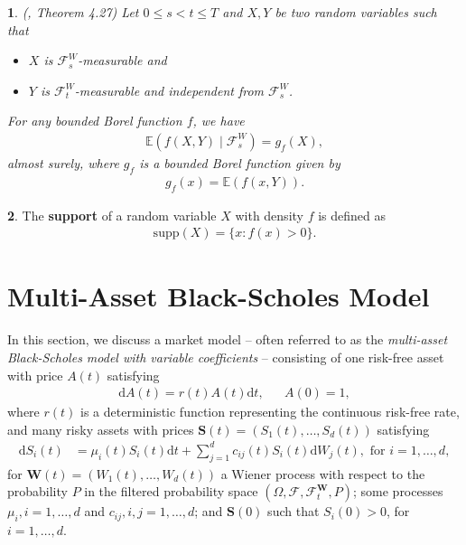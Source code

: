 \documentclass[english]{article}
\newcommand{\comment}[1]{\color{blue}#1\color{black}}
\numberwithin{equation}{section}
\numberwithin{figure}{section}
\theoremstyle{bolddescit}
\newtheorem{theorem}{\protect\theoremname}[section]
\theoremstyle{definition}
\newtheorem{definition}[theorem]{\protect\definitionname}
\theoremstyle{definition}
\theoremstyle{plain}
\theoremstyle{plain}
\theoremstyle{bolddesc}
\theoremstyle{plain}
\theoremstyle{remark}
\providecommand{\definitionname}{Definition}
\providecommand{\theoremname}{Theorem}
\begin{document}
\begin{theorem}\label{thm:cond-exp-measurable-independent}
  (\cite{kopp_probability_2013}, Theorem 4.27)
  Let $0 \le s < t \le T$ and $X, Y$ be two random variables such that
  \begin{itemize}
    \item $X$ is $\mathcal{F}^W_s$-measurable and
    \item $Y$ is $\mathcal{F}^W_t$-measurable and independent from $\mathcal{F}^W_s$.
  \end{itemize}
  For any bounded Borel function $f$, we have
  \begin{align*}
    \mathbb{E}(f(X,Y) \mid \mathcal{F}^W_s) = g_f(X),
  \end{align*}
  almost surely, where $g_f$ is a bounded Borel function given by
  \begin{align*}
    g_f(x) = \mathbb{E}(f(x,Y)).
  \end{align*}
\end{theorem}

\begin{definition}
  The \textbf{support} of a random variable $X$ with density $f$ is defined as
  \begin{align*}
    \mathrm{supp}(X) = \{x : f(x) > 0\}.
  \end{align*}
\end{definition}

\section{Multi-Asset Black-Scholes Model}

In this section, we discuss a market model -- often referred to as the \textit{multi-asset Black-Scholes model with variable coefficients} -- consisting of one risk-free asset with price $A(t)$ satisfying
\begin{align}\label{eq:multi-bs-eq-risk-free}
  \mathrm{d}A(t) = r(t) A(t) \mathrm{d}t, && A(0) = 1,
\end{align}
where $r(t)$ is a deterministic function representing the continuous risk-free rate, and many risky assets with prices $\mathbf{S}(t) = (S_1(t), \ldots, S_d(t))$ satisfying
\begin{align}
  \mathrm{d}S_i(t) &= \mu_i(t) S_i(t) \mathrm{d}t + \sum_{j=1}^{d} c_{ij}(t) S_i(t) \mathrm{d}W_j(t), \text{ for } i = 1,\ldots,d,\label{eq:multi-bs-eq}
\end{align}
for $\mathbf{W}(t) = (W_1(t), \ldots, W_d(t))$ a Wiener process with respect to the probability $P$ in the filtered probability space $(\Omega, \mathcal{F}, \mathcal{F}^\mathbf{W}_t, P)$; some processes $\mu_i, i=1,\ldots,d$ and $c_{ij}, i,j=1,\ldots,d$; and $\mathbf{S}(0)$ such that $S_i(0) > 0$, for $i=1,\ldots,d$.
\end{document}
